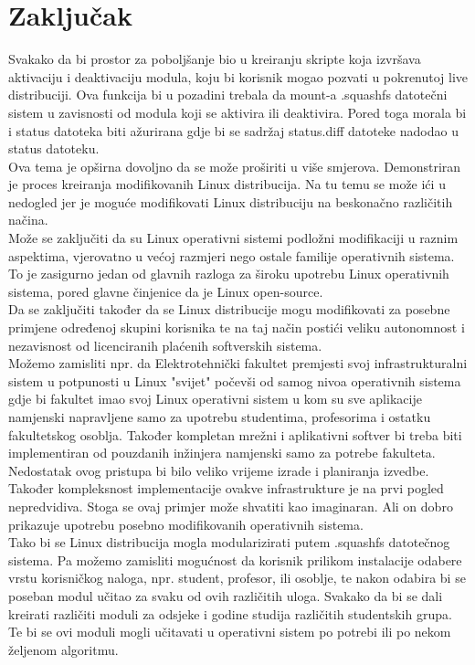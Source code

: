 \documentclass[12pt,vi]{mitthesis}
\begin{document}
\chapter*{Zaključak}
\indent
Svakako da bi prostor za poboljšanje bio u kreiranju skripte koja izvršava aktivaciju i deaktivaciju modula, koju bi korisnik mogao pozvati u pokrenutoj live distribuciji. Ova funkcija bi u pozadini trebala da mount-a .squashfs datotečni sistem u zavisnosti od modula koji se aktivira ili deaktivira. Pored toga morala bi i status datoteka biti ažurirana gdje bi se sadržaj status.diff datoteke nadodao u status datoteku.\\
Ova tema je opširna dovoljno da se može proširiti u više smjerova. Demonstriran je proces kreiranja modifikovanih Linux distribucija. Na tu temu se može ići u nedogled jer je moguće modifikovati Linux distribuciju na beskonačno različitih načina.\\
Može se zaključiti da su Linux operativni sistemi podložni modifikaciji u raznim aspektima, vjerovatno u većoj razmjeri nego ostale familije operativnih sistema. To je zasigurno jedan od glavnih razloga za široku upotrebu Linux operativnih sistema, pored glavne činjenice da je Linux open-source.\\
Da se zaključiti također da se Linux distribucije mogu modifikovati za posebne primjene određenoj skupini korisnika te na taj način postići veliku autonomnost i nezavisnost od licenciranih plaćenih softverskih sistema.\\
Možemo zamisliti npr. da Elektrotehnički fakultet premjesti svoj infrastrukturalni sistem u potpunosti u Linux "svijet" počevši od samog nivoa operativnih sistema gdje bi fakultet imao svoj Linux operativni sistem u kom su sve aplikacije namjenski napravljene samo za upotrebu studentima, profesorima i ostatku fakultetskog osoblja. Također kompletan mrežni i aplikativni softver bi treba biti implementiran od pouzdanih inžinjera namjenski samo za potrebe fakulteta.\\
Nedostatak ovog pristupa bi bilo veliko vrijeme izrade i planiranja izvedbe. Također kompleksnost implementacije ovakve infrastrukture je na prvi pogled nepredvidiva. Stoga se ovaj primjer može shvatiti kao imaginaran. Ali on dobro prikazuje upotrebu posebno modifikovanih operativnih sistema.\\
\indent
Tako bi se Linux distribucija mogla modularizirati putem .squashfs datotečnog sistema. Pa možemo zamisliti mogućnost da korisnik prilikom instalacije odabere vrstu korisničkog naloga, npr. student, profesor, ili osoblje, te nakon odabira bi se poseban modul učitao za svaku od ovih različitih uloga. Svakako da bi se dali kreirati različiti moduli za odsjeke i godine studija različitih studentskih grupa. Te bi se ovi moduli mogli učitavati u operativni sistem po potrebi ili po nekom željenom algoritmu.
\end{document}
